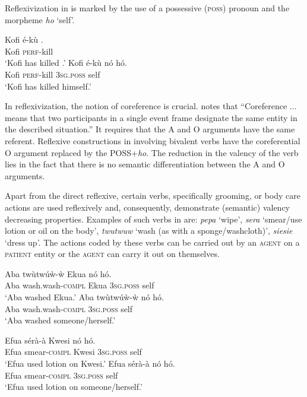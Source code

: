 \documentclass[output=paper]{langsci/langscibook}
\begin{document}
Reflexivization in  is marked by the use of a possessive (\textsc{poss}) pronoun and the morpheme \textit{ho} `self'.

\ea\label{ex:28.osam}
\ea\label{ex:28a.osam}
\gll   Kofi  é-kù    .\\
       Kofi  \textsc{perf}-kill  \\
\glt `Kofi has killed .'
\ex\label{ex:28b.osam}
\gll   Kofi    é-kù    nó    hó.\\
       Kofi    \textsc{perf}-kill  \textsc{3sg.poss}  self\\
\glt `Kofi has killed himself.'
\z 
\z 


In reflexivization, the notion of coreference is crucial. \citet[44]{kemmer1993} notes that ``Coreference ...  means that two participants in a single event frame designate the same entity in the described situation.''  It requires that the A and O arguments have the same referent. Reflexive constructions in  involving bivalent verbs have the coreferential O argument replaced by the POSS+\textit{ho}.  The reduction in the valency of the verb lies in the fact that there is no semantic differentiation between the A and O arguments. 

Apart from the direct reflexive, certain verbs, specifically grooming, or body care actions \citep{kemmer1993} are used reflexively and, consequently, demonstrate (semantic) valency decreasing properties. Examples of such verbs in  are: \textit{pepa} `wipe', \textit{sera} `smear/use lotion or oil on the body', \textit{twutwuw} `wash (as with a sponge/washcloth)', \textit{siesie} `dress up'. The actions coded by these verbs can be carried out by an \textsc{agent} on a \textsc{patient} entity or the \textsc{agent} can carry it out on themselves. 

\ea\label{ex:29.osam}
\ea\label{ex:29a.osam}
\gll   Aba  twùtwúẁ-ẁ    Ekua  nó    hó.\\
       Aba  wash.wash-\textsc{compl}  Ekua  \textsc{3sg.poss}  self\\
\glt   `Aba washed Ekua.'
\ex\label{ex:29b.osam}
\gll   Aba  twùtwúẁ-ẁ    nó    hó.\\
       Aba  wash.wash-\textsc{compl}  \textsc{3sg.poss}  self\\
\glt   `Aba washed someone/herself.'
\z 
\z 


\ea\label{ex:30.osam}
\ea\label{ex:30a.osam}
\gll   Efua  sérà-à    Kwesi    nó    hó.\\
       Efua  smear-\textsc{compl}  Kwesi    \textsc{3sg.poss}  self\\
\glt   `Efua used lotion on Kwesi.'
\ex\label{ex:30b.osam}
\gll    Efua  sérà-à    nó    hó.\\
       Efua  smear-\textsc{compl}  \textsc{3sg.poss}  self\\
\glt   `Efua used lotion on someone/herself.'
\z 
\z 
\end{document}
